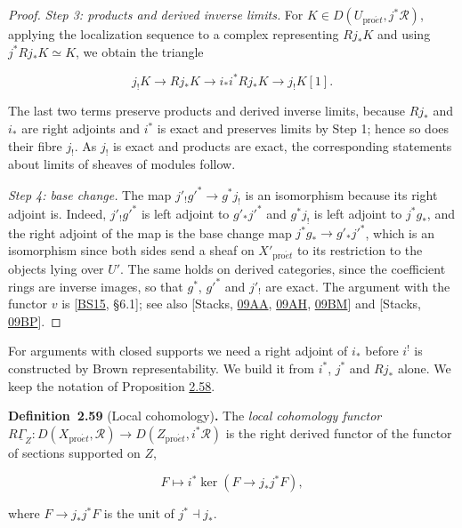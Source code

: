 \documentclass[11pt]{article}
\newenvironment{bpstatement}[2]{\par\addvspace{0.6\baselineskip}\noindent\textbf{#1}#2\textbf{.}\enspace\ignorespaces}
  {\par\addvspace{0.4\baselineskip}}
\begin{document}
\begin{proof}[{Proof}]
\emph{Step 3: products and derived inverse limits.} For \(K\in D(U_{\mathrm{pro}\acute{e}t},j^*\mathcal R)\), applying the localization sequence to a complex representing \(Rj_*K\) and using \(j^*Rj_*K\simeq K\), we obtain the triangle

\[
j_!K\longrightarrow Rj_*K\longrightarrow i_*i^*Rj_*K
\longrightarrow j_!K[1].
\]

The last two terms preserve products and derived inverse limits, because \(Rj_*\) and \(i_*\) are right adjoints and \(i^*\) is exact and preserves limits by Step 1; hence so does their fibre \(j_!\). As \(j_!\) is exact and products are exact, the corresponding statements about limits of sheaves of modules follow.

\emph{Step 4: base change.} The map \(j'_!g'^*\to g^*j_!\) is an isomorphism because its right adjoint is. Indeed, \(j'_!g'^*\) is left adjoint to \(g'_*j'^*\) and \(g^*j_!\) is left adjoint to \(j^*g_*\), and the right adjoint of the map is the base change map \(j^*g_*\to g'_*j'^*\), which is an isomorphism since both sides send a sheaf on \(X'_{\mathrm{pro}\acute{e}t}\) to its restriction to the objects lying over \(U'\). The same holds on derived categories, since the coefficient rings are inverse images, so that \(g^*\), \(g'^*\) and \(j'_!\) are exact. The argument with the functor \(v\) is [\hyperref[bp191]{BS15}, §6.1]; see also [Stacks, \href{https://stacks.math.columbia.edu/tag/09AA}{09AA}, \href{https://stacks.math.columbia.edu/tag/09AH}{09AH}, \href{https://stacks.math.columbia.edu/tag/09BM}{09BM}] and [Stacks, \href{https://stacks.math.columbia.edu/tag/09BP}{09BP}].
\end{proof}

\label{bp181}%
For arguments with closed supports we need a right adjoint of \(i_*\) before \(i^!\) is constructed by Brown representability. We build it from \(i^*\), \(j^*\) and \(Rj_*\) alone. We keep the notation of Proposition \hyperref[bp179]{2.58}.

\label{bp182}%
\begin{bpstatement}{Definition~2.59}{ (Local cohomology)}
The \emph{local cohomology functor} \(R\underline\Gamma_Z:D(X_{\mathrm{pro}\acute{e}t},\mathcal R)\to D(Z_{\mathrm{pro}\acute{e}t},i^*\mathcal R)\) is the right derived functor of the functor of sections supported on \(Z\),

\[
F\longmapsto i^*\ker(F\longrightarrow j_*j^*F),
\]

where \(F\to j_*j^*F\) is the unit of \(j^*\dashv j_*\).
\end{bpstatement}
\end{document}

